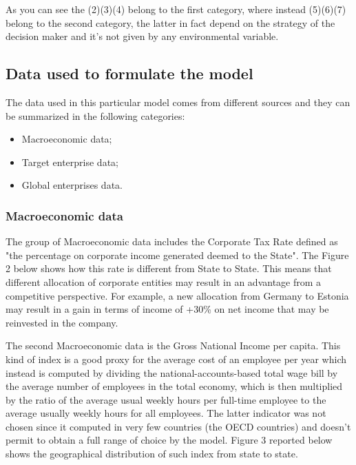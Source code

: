 \documentclass{article}
\begin{document}
As you can see the (2)(3)(4) belong to the first category, where instead (5)(6)(7) belong to the second category, the latter in fact depend on the strategy of the decision maker and it's not given by any environmental variable.


\subsection{Data used to formulate the model}
The data used in this particular model comes from different sources and they can be summarized in the following categories:
\begin{itemize}
    \item Macroeconomic data;
    \item Target enterprise data;
    \item Global enterprises data.
\end{itemize}

\subsubsection{Macroeconomic data}
The group of Macroeconomic data includes the Corporate Tax Rate defined as "the percentage on corporate income generated deemed to the State". The Figure 2 below shows how this rate is different from State to State. This means that different allocation of corporate entities may result in an advantage from a competitive perspective. For example, a new allocation from Germany to Estonia may result in a gain in terms of income of +30\% on net income that may be reinvested in the company.  

The second Macroeconomic data is the Gross National Income per capita. This kind of index is a good proxy for the average cost of an employee per year which instead is computed by dividing the national-accounts-based total wage bill by the average number of employees in the total economy, which is then multiplied by the ratio of the average usual weekly hours per full-time employee to the average usually weekly hours for all employees. The latter indicator was not chosen since it computed in very few countries (the OECD countries) and doesn't permit to obtain a full range of choice by the model. Figure 3 reported below shows the geographical distribution of such index from state to state.
\end{document}
